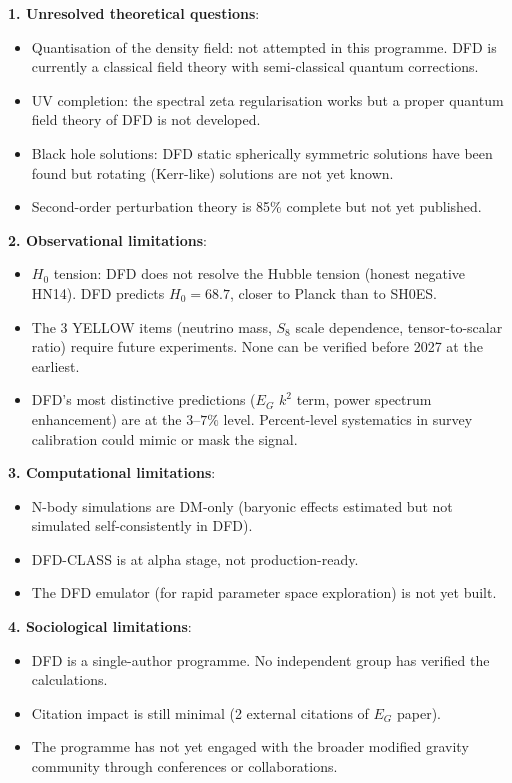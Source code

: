\documentclass[11pt,a4paper]{article}
\begin{document}
\begin{tcolorbox}[colback=blue!5!white, colframe=dfdblue, title=\textbf{Draft: Honest Assessment of DFD Limitations}]

\textbf{1. Unresolved theoretical questions}:
\begin{itemize}[nosep]
\item Quantisation of the density field: not attempted in this programme. DFD is currently a classical field theory with semi-classical quantum corrections.
\item UV completion: the spectral zeta regularisation works but a proper quantum field theory of DFD is not developed.
\item Black hole solutions: DFD static spherically symmetric solutions have been found but rotating (Kerr-like) solutions are not yet known.
\item Second-order perturbation theory is 85\% complete but not yet published.
\end{itemize}

\textbf{2. Observational limitations}:
\begin{itemize}[nosep]
\item $H_0$ tension: DFD does not resolve the Hubble tension (honest negative HN14). DFD predicts $H_0 = 68.7$, closer to Planck than to SH0ES.
\item The 3 YELLOW items (neutrino mass, $S_8$ scale dependence, tensor-to-scalar ratio) require future experiments. None can be verified before 2027 at the earliest.
\item DFD's most distinctive predictions ($E_G$ $k^2$ term, power spectrum enhancement) are at the $3$--$7\%$ level. Percent-level systematics in survey calibration could mimic or mask the signal.
\end{itemize}

\textbf{3. Computational limitations}:
\begin{itemize}[nosep]
\item N-body simulations are DM-only (baryonic effects estimated but not simulated self-consistently in DFD).
\item DFD-CLASS is at alpha stage, not production-ready.
\item The DFD emulator (for rapid parameter space exploration) is not yet built.
\end{itemize}

\textbf{4. Sociological limitations}:
\begin{itemize}[nosep]
\item DFD is a single-author programme. No independent group has verified the calculations.
\item Citation impact is still minimal (2 external citations of $E_G$ paper).
\item The programme has not yet engaged with the broader modified gravity community through conferences or collaborations.
\end{itemize}
\end{tcolorbox}
\end{document}

